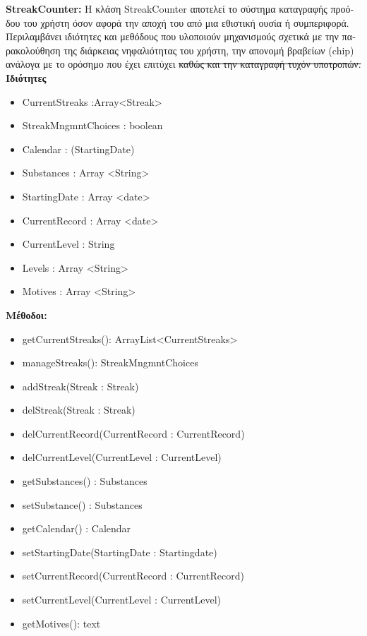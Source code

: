 \documentclass{article}
\begin{document}
\textbf{StreakCounter:} \textgreek{Η κλάση} StreakCounter \textgreek{αποτελεί το σύστημα καταγραφής προόδου του χρήστη όσον αφορά την αποχή του από μια εθιστική ουσία ή συμπεριφορά. Περιλαμβάνει ιδιότητες και μεθόδους που υλοποιούν μηχανισμούς σχετικά με την παρακολούθηση της διάρκειας νηφαλιότητας του χρήστη, την απονομή βραβείων} (chip) \textgreek{ανάλογα με το ορόσημο που έχει επιτύχει \st{καθώς και την καταγραφή τυχόν υποτροπών.}}
\newline
\newline
\textbf{\textgreek{Ιδιότητες}}
\begin{itemize}
    \item CurrentStreaks :Array<Streak>
    \item StreakMngmntChoices : boolean
    \item Calendar : (StartingDate)
    \item Substances : Array <String>
    \item StartingDate : Array <date>
    \item CurrentRecord : Array <date>
    \item CurrentLevel : String
    \item Levels : Array <String>
    \item Motives : Array <String>
\end{itemize}
\textbf{\textgreek{Μέθοδοι:}}
\begin{itemize}
    \item getCurrentStreaks(): ArrayList<CurrentStreaks>
    \item manageStreaks(): StreakMngmntChoices
    \item addStreak(Streak : Streak)
    \item delStreak(Streak : Streak)
    \item delCurrentRecord(CurrentRecord : CurrentRecord)
    \item delCurrentLevel(CurrentLevel : CurrentLevel)
    \item getSubstances() : Substances
    \item setSubstance() : Substances
    \item getCalendar() : Calendar
    \item setStartingDate(StartingDate : Startingdate)
    \item setCurrentRecord(CurrentRecord : CurrentRecord)
    \item setCurrentLevel(CurrentLevel : CurrentLevel)
    \item getMotives(): text
    
\end{itemize}
\end{document}
